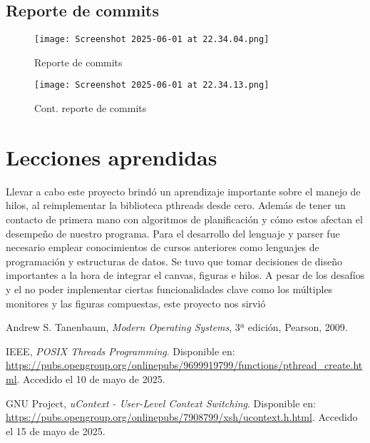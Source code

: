 \documentclass[12pt]{article}
\begin{document}
\subsection{Reporte de commits}
\begin{figure}[H]
    \centering
    \texttt{[image: Screenshot 2025-06-01 at 22.34.04.png]}
    \caption{Reporte de commits}
    \label{fig:animador_run}
\end{figure}
\begin{figure}[H]
    \centering
    \texttt{[image: Screenshot 2025-06-01 at 22.34.13.png]}
    \caption{Cont. reporte de commits}
    \label{fig:animador_run}
\end{figure}

  
 



\section{Lecciones aprendidas}


Llevar a cabo este proyecto brindó un aprendizaje importante sobre el manejo de hilos, al reimplementar la biblioteca pthreads desde cero. Además de tener un contacto de primera mano con algoritmos de planificación y cómo estos afectan el desempeño de nuestro programa.
Para el desarrollo del lenguaje y parser fue necesario emplear conocimientos de cursos anteriores como lenguajes de programación y estructuras de datos. Se tuvo que tomar decisiones de diseño importantes a la hora de integrar el canvas, figuras e hilos.
A pesar de los desafíos y el no poder implementar ciertas funcionalidades clave como los múltiples monitores y las figuras compuestas, este proyecto nos sirvió 

\newpage

\begin{thebibliography}{9}




Andrew S. Tanenbaum, \emph{Modern Operating Systems}, 3ª edición, Pearson, 2009.

IEEE, \emph{POSIX Threads Programming}. Disponible en: \url{https://pubs.opengroup.org/onlinepubs/9699919799/functions/pthread_create.html}. Accedido el 10 de mayo de 2025.

GNU Project, \emph{uContext - User-Level Context Switching}. Disponible en: \url{https://pubs.opengroup.org/onlinepubs/7908799/xsh/ucontext.h.html}. Accedido el 15 de mayo de 2025.

\end{thebibliography}
\end{document}

